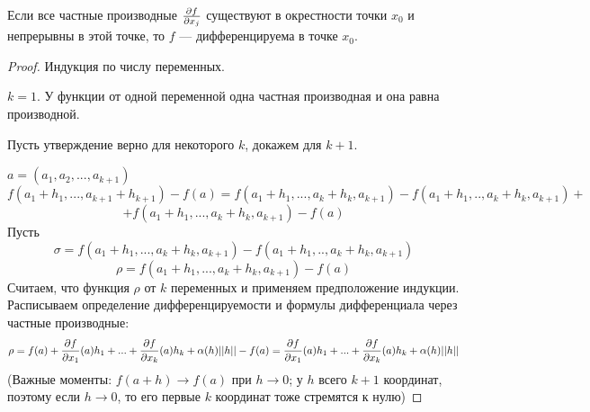     \begin{theorem}
    	Если все частные производные $\frac{\partial f}{\partial x_j}$ существуют в окрестности точки $x_0$ и непрерывны в этой точке, то $f$ — дифференцируема в точке $x_0$.
    \end{theorem}
    
    \begin{proof}
    	Индукция по числу переменных.
    	
    	$k = 1.$ У функции от одной переменной одна частная производная и она равна производной.
    	
    	Пусть утверждение верно для некоторого $k$, докажем для $k + 1$.
    	
    	$a = (a_1, a_2, ..., a_{k + 1})$
    	\[ f(a_1 + h_1, ..., a_{k + 1} + h_{k + 1}) - f(a) = f(a_1 + h_1, ..., a_k + h_k, a_{k + 1}) - f(a_1 + h_1, .., a_k + h_k, a_{k + 1}) + \]
    	\[ + f(a_1 + h_1, ..., a_k + h_k, a_{k + 1}) - f(a) \]
    	Пусть
    	\[ \sigma = f(a_1 + h_1, ..., a_k + h_k, a_{k + 1}) - f(a_1 + h_1, .., a_k + h_k, a_{k + 1}) \]
    	\[ \rho = f(a_1 + h_1, ..., a_k + h_k, a_{k + 1}) - f(a) \]
    	Считаем, что функция $\rho$ от $k$ переменных и применяем предположение индукции. Расписываем определение дифференцируемости и формулы дифференциала через частные производные:
    	\[ \rho = f(a) + \frac{\partial f}{\partial x_1}(a)h_1 + ... + \frac{\partial f}{\partial x_k}(a)h_k + \alpha(h)||h|| - f(a) = \frac{\partial f}{\partial x_1}(a)h_1 + ... + \frac{\partial f}{\partial x_k}(a)h_k + \alpha(h)||h|| \]
    	(Важные моменты: $f(a + h) \to f(a)$ при $h \to 0$; у $h$ всего $k + 1$ координат, поэтому если $h \to 0$, то его первые $k$ координат тоже стремятся к нулю)
    	

\end{proof}
